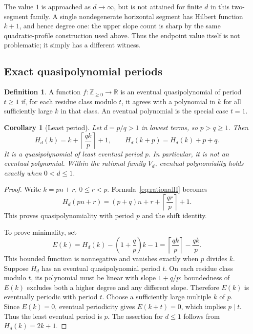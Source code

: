 \documentclass[11pt,a4paper]{article}
\numberwithin{equation}{section}
\newtheorem{corollary}[theorem]{Corollary}
\theoremstyle{definition}
\newtheorem{definition}[theorem]{Definition}
\theoremstyle{remark}
\newcommand{\R}{\mathbb R}
\newcommand{\N}{\mathbb Z_{\geq0}}
\newcommand{\ceil}[1]{\left\lceil #1\right\rceil}
\begin{document}
The value $1$ is approached as $d\to\infty$, but is not attained for finite
$d$ in this two-segment family. A single nondegenerate horizontal segment
has Hilbert function $k+1$, and hence degree one: the upper slope count is
sharp by the same quadratic-profile construction used above. Thus the
endpoint value itself is not problematic; it simply has a different witness.

\subsection{Exact quasipolynomial periods}

\begin{definition}
A function $f:\N\to\R$ is an eventual quasipolynomial of period $t\geq1$ if,
for each residue class modulo $t$, it agrees with a polynomial in $k$ for all
sufficiently large $k$ in that class. An eventual polynomial is the special
case $t=1$.
\end{definition}

\begin{corollary}[Least period]
\label{cor:period}
Let $d=p/q>1$ in lowest terms, so $p>q\geq1$. Then
\begin{equation}
\label{eq:rationalH}
H_d(k)=k+\ceil{\frac{qk}{p}}+1,
\qquad
H_d(k+p)=H_d(k)+p+q.
\end{equation}
It is a quasipolynomial of least eventual period $p$. In particular,
it is not an eventual polynomial. Within the rational family $V_d$, eventual
polynomiality holds exactly when $0<d\leq1$.
\end{corollary}

\begin{proof}
Write $k=pn+r$, $0\leq r<p$. Formula~\eqref{eq:rationalH} becomes
\begin{equation}
\label{eq:residuegeneral}
H_d(pn+r)=(p+q)n+r+\ceil{\frac{qr}{p}}+1.
\end{equation}
This proves quasipolynomiality with period $p$ and the shift identity.

To prove minimality, set
\[
E(k)=H_d(k)-\left(1+\frac qp\right)k-1
=\ceil{\frac{qk}{p}}-\frac{qk}{p}.
\]
This bounded function is nonnegative and vanishes exactly when $p$ divides
$k$. Suppose $H_d$ has an eventual quasipolynomial period $t$. On each residue
class modulo $t$, its polynomial must be linear with slope $1+q/p$:
boundedness of $E(k)$ excludes both a higher degree and any different slope.
Therefore $E(k)$ is eventually periodic with period $t$. Choose a sufficiently
large multiple $k$ of $p$. Since $E(k)=0$, eventual periodicity gives
$E(k+t)=0$, which implies $p\mid t$. Thus the least eventual period is $p$.
The assertion for $d\leq1$ follows from $H_d(k)=2k+1$.
\end{proof}
\end{document}
